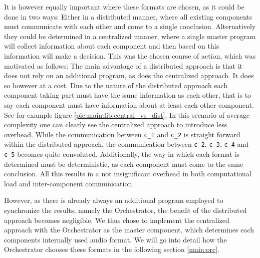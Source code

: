 \label{main:lib:format_chooosing}
It is however equally important where these formats are chosen, as it could be done in two ways:
Either in a distributed manner, where all existing components must communicate with each other and come to a single conclusion.
Alternatively they could be determined in a centralized manner, where a single master program will collect information about each component and then based on this information will make a decision.
This was the chosen course of action, which was motivated as follows:
The main advantage of a distributed approach is that it does not rely on an additional program, as does the centralized approach.
It does so however at a cost. 
Due to the nature of the distributed approach each component taking part must have the same information as each other, that is to say each component must have information about at least each other component.
See for example figure \ref{pic:main:lib:central_vs_dist}.
In this scenario of average complexity one can clearly see the centralized approach to introduce less overhead.
While the communication between \texttt{c\_1} and \texttt{c\_2} is straight forward within the distributed approach, the communication between \texttt{c\_2}, \texttt{c\_3}, \texttt{c\_4} and \texttt{c\_5} becomes quite convoluted.
Additionally, the way in which each format is determined must be deterministic, as each component must come to the same conclusion.
All this results in a not insignificant overhead in both computational load and inter-component communication.

However, as there is already always an additional program  employed to synchronize the results, namely the Orchestrator, the benefit of the distributed approach becomes negligible.
We thus chose to implement the centralized approach with the Orchestrator as the master component, which determines each components internally used audio format.
We will go into detail how the Orchestrator chooses these formats in the following section \ref{main:orc}.

